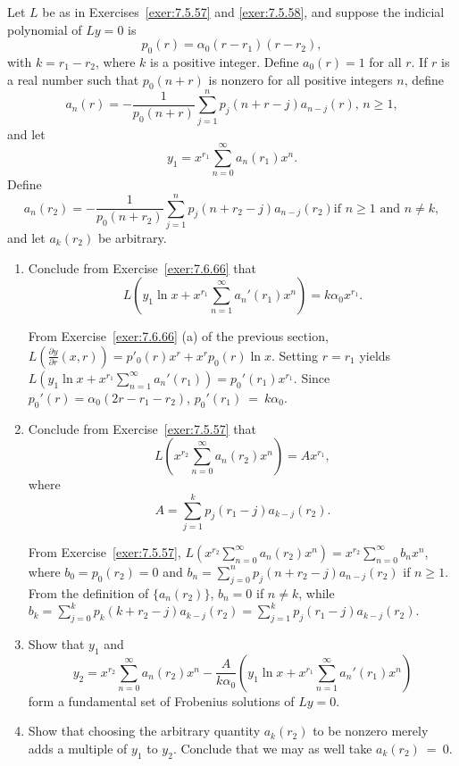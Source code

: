 \documentclass{ximera}
\begin{document}
\begin{problem}\label{exer:7.7.48}
Let $L$ be as in Exercises~\ref{exer:7.5.57} and
 \ref{exer:7.5.58}, and
suppose the indicial polynomial  of $Ly=0$ is
$$
p_0(r)=\alpha_0(r-r_1)(r-r_2),
$$
with $k=r_1-r_2$, where $k$ is a positive integer. Define $a_0(r)=1$
for all $r$.  If $r$ is a real number such that $p_0(n+r)$
is nonzero for all positive integers $n$,  define
$$
a_n(r)=-\frac{1}{ p_0(n+r)}\sum_{j=1}^n p_j(n+r-j)a_{n-j}(r),\,n\geq 1,
$$
and let
$$
y_1=x^{r_1}\sum_{n=0}^\infty a_n(r_1)x^n.
$$
Define
$$
a_n(r_2)=-\frac{1}{ p_0(n+r_2)}\sum_{j=1}^n p_j(n+r_2-j)a_{n-j}(r_2)\mbox{
if } n\geq 1\mbox{ and }n\neq k,
$$
and let $a_k(r_2)$ be arbitrary.
\begin{enumerate}
\item %
Conclude from Exercise~\ref{exer:7.6.66} that
$$
L\left(y_1\ln x+x^{r_1}\sum_{n=1}^\infty
a_n'(r_1)x^n\right)=k\alpha_0x^{r_1}.
$$

\begin{solution}
    From Exercise~\ref{exer:7.6.66} (a) of the previous section, $L\left(\frac{\partial y}{ \partial
r}(x,r)\right)=p'_0(r)x^r+x^rp_0(r)\ln x$. Setting $r=r_1$ yields
$L\left(y_1\ln x+x^{r_1}\sum_{n=1}^\infty
a_n'(r_1)\right)=p_0'(r_1)x^{r_1}$. Since
$p_0'(r)=\alpha_0(2r-r_1-r_2)$, $p_0'(r_1)~=~k\alpha_0$.
\end{solution}
\item %
Conclude from Exercise~\ref{exer:7.5.57} that
$$
L\left(x^{r_2}\sum_{n=0}^\infty a_n(r_2)x^n\right)=Ax^{r_1},
$$
where
$$
A=\sum_{j=1}^k p_j(r_1-j)a_{k-j}(r_2).
$$

\begin{solution}
    From Exercise~\ref{exer:7.5.57}, 
    $L\left(x^{r_2}\sum_{n=0}^\infty a_n(r_2)x^n\right)=x^{r_2}
\sum_{n=0}^\infty b_nx^n$, where $b_0=p_0(r_2)=0$ and
$b_n=\sum_{j=0}^np_j(n+r_2-j)a_{n-j}(r_2)$ if $n\geq 1$. From the
definition of $\{a_n(r_2)\}$, $b_n=0$ if $n\neq k$, while
$b_k=\sum_{j=0}^kp_k(k+r_2-j)a_{k-j}(r_2)=
\sum_{j=1}^kp_j(r_1-j)a_{k-j}(r_2)$.
\end{solution}
\item %
Show that $y_1$  and
$$
y_2=x^{r_2}\sum_{n=0}^\infty a_n(r_2)x^n
-\frac{A}{ k\alpha_0}
\left(y_1 \ln x+x^{r_1}\sum_{n=1}^\infty a_n'(r_1)x^n\right)
$$
form a fundamental set of Frobenius solutions of $Ly=0$.
\item %
Show that choosing the arbitrary quantity $a_k(r_2)$ to be nonzero
merely adds a multiple of $y_1$ to $y_2$. Conclude that we may
as well take $a_k(r_2)~=~0$.


\end{enumerate}
\end{problem}
\end{document}
